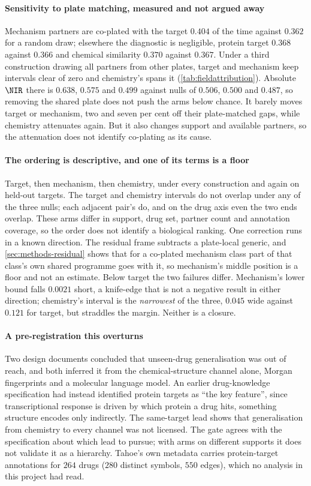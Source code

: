 \paragraph{Sensitivity to plate matching, measured and not argued away} Mechanism
partners are co-plated with the target $0.404$ of the time against $0.362$ for a
random draw; elsewhere the diagnostic is negligible, protein target $0.368$
against $0.366$ and chemical similarity $0.370$ against $0.367$. Under a third
construction drawing all partners from other plates, target and mechanism keep
intervals clear of zero and chemistry's spans it
(\cref{tab:fieldattribution}). Absolute $\NIR$ there is $0.638$, $0.575$ and
$0.499$ against nulls of $0.506$, $0.500$ and $0.487$, so removing the shared
plate does not push the arms below chance. It barely moves target or mechanism,
two and seven per cent off their plate-matched gaps, while chemistry attenuates
again. But it also changes support and available partners, so the attenuation
does not identify co-plating as its cause.

\paragraph{The ordering is descriptive, and one of its terms is a floor} Target,
then mechanism, then chemistry, under every construction and again on held-out
targets. The target and chemistry intervals do not overlap under any of the three
nulls; each adjacent pair's do, and on the drug axis even the two ends overlap.
These arms differ in support, drug set, partner count and annotation coverage, so
the order does not identify a biological ranking. One correction runs in a known
direction. The residual frame subtracts a plate-local generic, and
\cref{sec:methods-residual} shows that for a co-plated mechanism class part of
that class's own shared programme goes with it, so mechanism's middle position is
a floor and not an estimate. Below target the two failures differ. Mechanism's
lower bound falls $0.0021$ short, a knife-edge that is not a negative result in
either direction; chemistry's interval is the \emph{narrowest} of the three,
$0.045$ wide against $0.121$ for target, but straddles the margin. Neither is a
closure.

\paragraph{A pre-registration this overturns} Two design documents concluded that
unseen-drug generalisation was out of reach, and both inferred it from the
chemical-structure channel alone, Morgan fingerprints and a molecular language
model. An earlier drug-knowledge specification had instead identified protein
targets as ``the key feature'', since transcriptional response is driven by which
protein a drug hits, something structure encodes only indirectly. The
same-target lead shows that generalisation from chemistry to every channel was
not licensed. The gate agrees with the specification about which lead to pursue;
with arms on different supports it does not validate it as a hierarchy. Tahoe's
own metadata carries protein-target annotations for $264$ drugs ($280$ distinct
symbols, $550$ edges), which no analysis in this project had read.

